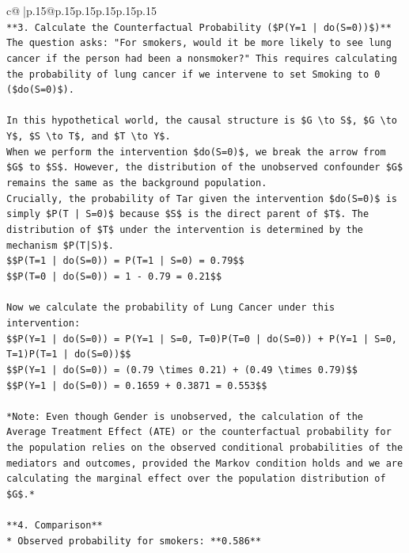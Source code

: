 \documentclass{article}
\begin{document}
{\begin{supertabular}{c@{$\;$}|p{.15\linewidth}@{}p{.15\linewidth}p{.15\linewidth}p{.15\linewidth}p{.15\linewidth}p{.15\linewidth}}
{{{\\ 
\texttt{**3. Calculate the Counterfactual Probability (\$P(Y=1 | do(S=0))\$)**} \\
\texttt{The question asks: "For smokers, would it be more likely to see lung cancer if the person had been a nonsmoker?" This requires calculating the probability of lung cancer if we intervene to set Smoking to 0 (\$do(S=0)\$).} \\
\\ 
\texttt{In this hypothetical world, the causal structure is \$G \textbackslash{}to S\$, \$G \textbackslash{}to Y\$, \$S \textbackslash{}to T\$, and \$T \textbackslash{}to Y\$.} \\
\texttt{When we perform the intervention \$do(S=0)\$, we break the arrow from \$G\$ to \$S\$. However, the distribution of the unobserved confounder \$G\$ remains the same as the background population.} \\
\texttt{Crucially, the probability of Tar given the intervention \$do(S=0)\$ is simply \$P(T | S=0)\$ because \$S\$ is the direct parent of \$T\$. The distribution of \$T\$ under the intervention is determined by the mechanism \$P(T|S)\$.} \\
\texttt{\$\$P(T=1 | do(S=0)) = P(T=1 | S=0) = 0.79\$\$} \\
\texttt{\$\$P(T=0 | do(S=0)) = 1 {-} 0.79 = 0.21\$\$} \\
\\ 
\texttt{Now we calculate the probability of Lung Cancer under this intervention:} \\
\texttt{\$\$P(Y=1 | do(S=0)) = P(Y=1 | S=0, T=0)P(T=0 | do(S=0)) + P(Y=1 | S=0, T=1)P(T=1 | do(S=0))\$\$} \\
\texttt{\$\$P(Y=1 | do(S=0)) = (0.79 \textbackslash{}times 0.21) + (0.49 \textbackslash{}times 0.79)\$\$} \\
\texttt{\$\$P(Y=1 | do(S=0)) = 0.1659 + 0.3871 = 0.553\$\$} \\
\\ 
\texttt{*Note: Even though Gender is unobserved, the calculation of the Average Treatment Effect (ATE) or the counterfactual probability for the population relies on the observed conditional probabilities of the mediators and outcomes, provided the Markov condition holds and we are calculating the marginal effect over the population distribution of \$G\$.*} \\
\\ 
\texttt{**4. Comparison**} \\
\texttt{*   Observed probability for smokers: **0.586**} \\
}}}
\end{supertabular}}
\end{document}
